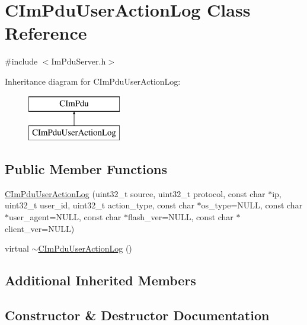 \hypertarget{class_c_im_pdu_user_action_log}{}\section{C\+Im\+Pdu\+User\+Action\+Log Class Reference}
\label{class_c_im_pdu_user_action_log}


{\ttfamily \#include $<$Im\+Pdu\+Server.\+h$>$}

Inheritance diagram for C\+Im\+Pdu\+User\+Action\+Log\+:\begin{figure}[H]
\begin{center}
\leavevmode
\includegraphics[height=2.000000cm]{class_c_im_pdu_user_action_log}
\end{center}
\end{figure}
\subsection*{Public Member Functions}
\begin{DoxyCompactItemize}
\item 
\hyperlink{class_c_im_pdu_user_action_log_ac754817901e58cabc7bdba9fd0a53c6d}{C\+Im\+Pdu\+User\+Action\+Log} (uint32\+\_\+t source, uint32\+\_\+t protocol, const char $\ast$ip, uint32\+\_\+t user\+\_\+id, uint32\+\_\+t action\+\_\+type, const char $\ast$os\+\_\+type=N\+U\+L\+L, const char $\ast$user\+\_\+agent=N\+U\+L\+L, const char $\ast$flash\+\_\+ver=N\+U\+L\+L, const char $\ast$client\+\_\+ver=N\+U\+L\+L)
\item 
virtual \hyperlink{class_c_im_pdu_user_action_log_aa99315b36b082bd245fa3e585a63e3c0}{$\sim$\+C\+Im\+Pdu\+User\+Action\+Log} ()
\end{DoxyCompactItemize}
\subsection*{Additional Inherited Members}


\subsection{Constructor \& Destructor Documentation}
\hypertarget{class_c_im_pdu_user_action_log_ac754817901e58cabc7bdba9fd0a53c6d}{}
